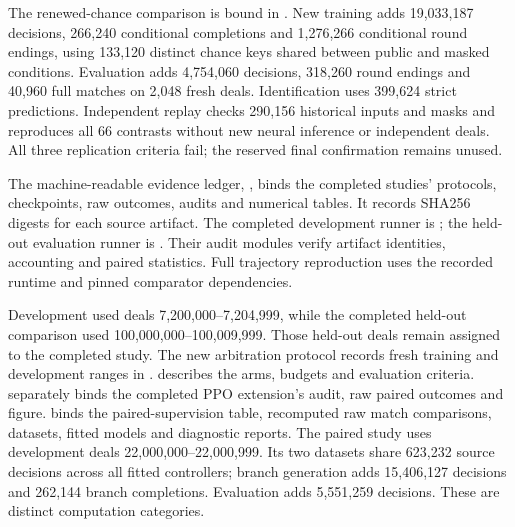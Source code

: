 The renewed-chance comparison is bound in
. New training
adds 19,033,187 decisions, 266,240 conditional completions and 1,276,266
conditional round endings, using 133,120 distinct chance keys shared between
public and masked conditions. Evaluation adds 4,754,060 decisions, 318,260
round endings and 40,960 full matches on 2,048 fresh deals. Identification
uses 399,624 strict predictions. Independent replay checks 290,156 historical
inputs and masks and reproduces all 66 contrasts without new neural inference
or independent deals. All three replication criteria fail; the reserved final
confirmation remains unused.

The machine-readable evidence ledger,
, binds the completed studies'
protocols, checkpoints, raw outcomes, audits and numerical tables. It records
SHA256 digests for each source artifact.
The completed development runner is ;
the held-out evaluation runner is .
Their audit modules verify artifact identities, accounting and paired
statistics. Full trajectory reproduction uses the recorded runtime and pinned
comparator dependencies.

Development used deals 7,200,000--7,204,999, while the completed held-out
comparison used 100,000,000--100,009,999. Those held-out deals remain assigned
to the completed study. The new arbitration protocol records fresh training
and development ranges in .
 describes the arms, budgets and evaluation criteria.
 separately binds the
completed PPO extension's audit, raw paired outcomes and figure.
 binds the paired-supervision
table, recomputed raw match comparisons, datasets, fitted models and diagnostic
reports. The paired study uses development deals 22,000,000--22,000,999.
Its two datasets share 623,232 source decisions across all fitted controllers;
branch generation adds 15,406,127 decisions and 262,144 branch completions.
Evaluation adds 5,551,259 decisions. These are distinct computation categories.

